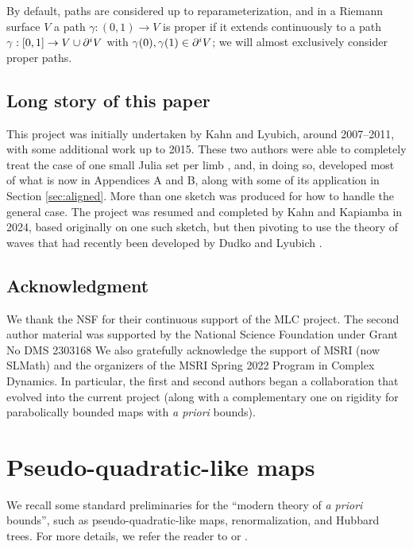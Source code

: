 \documentclass[12pt]{amsart}
\newcommand{\bignote}[1]{\begin{quote} \sf #1 \end{quote}}
\begin{document}
By default, paths are considered up to reparameterization, and in a Riemann surface $V$ a path $\gamma: (0, 1)\to V$ is proper if it extends continuously to a path $\gamma: [0, 1]\to V\cup \partial^i V$ with $\gamma(0), \gamma(1)\in \partial^i V$; we will almost exclusively consider proper paths. 



\subsection{{Long story of this paper}} %
This project was initially undertaken by Kahn and Lyubich, around 2007--2011, with some additional work up to 2015. 
These two authors were able to completely treat the case of one small Julia set per limb \cite{KL:eyes}, 
and, in doing so, developed most of what is now in Appendices A and B, along with some of its application in Section \ref{sec:aligned}. More than one sketch was produced for how to handle the general case. The project was resumed {and completed}  by Kahn and Kapiamba in 2024, based originally on one such sketch,
but then pivoting to use the theory of waves that had recently been developed by Dudko and Lyubich \cite{dudko2023mlcfeigenbaumpoints}. 

\subsection{Acknowledgment}
We thank the NSF for their continuous support of the MLC project. {The second author material was supported by the National Science Foundation under Grant No DMS 2303168}
{We also gratefully acknowledge the support of MSRI (now SLMath) and the organizers of the MSRI Spring 2022 Program in Complex Dynamics. In particular, the first and second authors began a collaboration that evolved into the current project (along with a complementary one on rigidity for parabolically bounded maps with \emph{a priori} bounds).}


\section{Pseudo-quadratic-like maps} \label{sec:prelim}
We recall some standard preliminaries for the ``modern theory of \emph{a priori} bounds'', such as pseudo-quadratic-like maps, renormalization, and Hubbard trees. For more details, we refer the reader to \cite{K06} or \cite{dudko2023mlcfeigenbaumpoints}.
\end{document}
